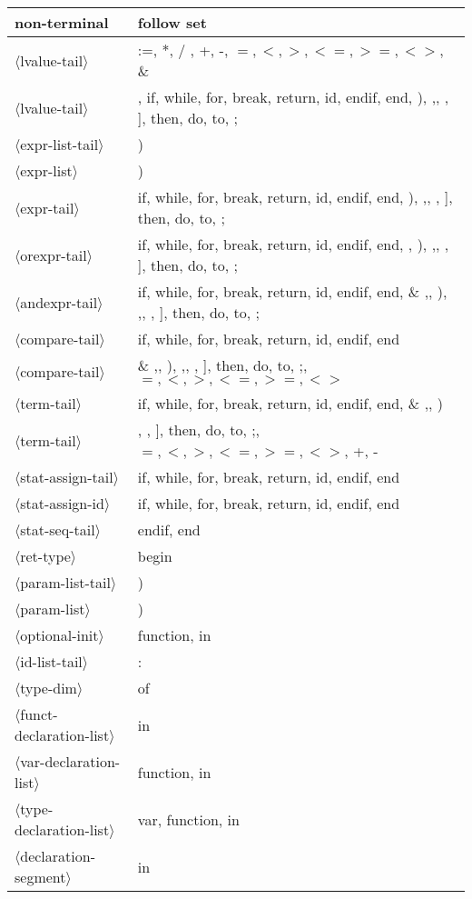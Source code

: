 \documentclass[11pt, fleqn]{article}
\newcommand{\atag}[1]{$\langle$#1$\rangle$}
\begin{document}
\begin{longtable}{l|l}
non-terminal						&	follow set												\\
\hline
\atag{lvalue-tail}				&	:=, *, /	, +, -, $=, <, >, <=, >=, <>$, \& \\
\atag{lvalue-tail}				&	\textbar , if, while, for, break, return, id, endif, end, ), ,, , ], then, do, to, ; 					\\
\atag{expr-list-tail}			&	)												\\
\atag{expr-list}					&	)								\\
\atag{expr-tail}					&	if, while, for, break, return, id, endif, end, ), ,, , ], then, do, to, ;	\\
\atag{orexpr-tail}				&	if, while, for, break, return, id, endif, end, \textbar , ), ,, , ], then, do, to, ;	\\
\atag{andexpr-tail}				&	if, while, for, break, return, id, endif, end, \& ,\textbar , ), ,, , ], then, do, to, ; 	\\
\atag{compare-tail}				&	if, while, for, break, return, id, endif, end	\\
\atag{compare-tail}				&	\& ,\textbar , ), ,, , ], then, do, to, ;, $=, <, >, <=, >=, <>$	\\
\atag{term-tail}					&	if, while, for, break, return, id, endif, end, \& ,\textbar , )	\\
\atag{term-tail}					&	, , ], then, do, to, ;, $=, <, >, <=, >=, <>$, +, -	\\
\atag{stat-assign-tail}			&	if, while, for, break, return, id, endif, end	\\
\atag{stat-assign-id}			&	if, while, for, break, return, id, endif, end	\\
\atag{stat-seq-tail}				&	endif, end		\\
\atag{ret-type}					&	begin		\\
\atag{param-list-tail}			&	)	\\
\atag{param-list}				&	)		\\
\atag{optional-init}				&	function, in		\\
\atag{id-list-tail}				&	:		\\
\atag{type-dim}					&	of	\\
\atag{funct-declaration-list}	&	in	\\
\atag{var-declaration-list}		&	function, in	\\
\atag{type-declaration-list}		&	var, function, in		\\
\atag{declaration-segment}		&	in	\\
\end{longtable}
\end{document}
